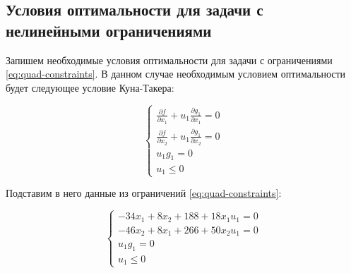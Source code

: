 \subsection{Условия оптимальности для задачи с нелинейными ограничениями}

Запишем необходимые условия оптимальности для задачи с ограничениями \ref{eq:quad-constraints}. В данном случае необходимым условием оптимальности будет следующее условие Куна-Такера:

\begin{equation*}
\begin{cases}
	\frac{\partial f}{\partial x_1} + u_1 \frac{\partial g_1}{\partial x_1} = 0
	\\
	\frac{\partial f}{\partial x_2} + u_1 \frac{\partial g_1}{\partial x_2} = 0
	\\
	u_1 g_1 = 0
	\\
	u_1 \leq 0
\end{cases}
\end{equation*}

Подставим в него данные из ограничений \ref{eq:quad-constraints}:

\begin{equation*}
\begin{cases}
	-34 x_1 + 8 x_2 + 188 + 18 x_1 u_1 = 0
	\\
	-46 x_2 + 8 x_1 + 266 + 50 x_2 u_1 = 0
	\\
	u_1 g_1 = 0
	\\
	u_1 \leq 0
\end{cases}
\end{equation*}

